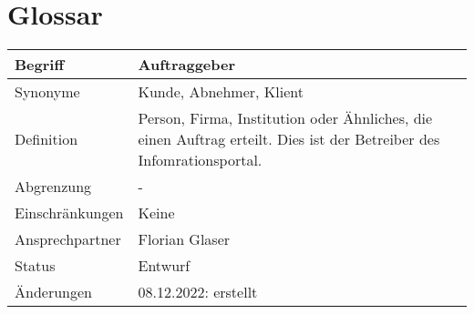 \section*{Glossar}\label{cha:glossar}


\begin{table}[H]
    \centering
    \label{gls:auftraggeber}
    \begin{tabularx}{\textwidth}{| l | X |}
        \hline
        Begriff         & Auftraggeber                                                                                                         \\
        \hline
        Synonyme        & Kunde, Abnehmer, Klient                                                                                              \\
        \hline
        Definition      & Person, Firma, Institution oder Ähnliches, die einen Auftrag erteilt. Dies ist der Betreiber des Infomrationsportal. \\
        \hline
        Abgrenzung      & -                                                                                                                    \\
        \hline
        Einschränkungen & Keine                                                                                                                \\
        \hline
        Ansprechpartner & Florian Glaser                                                                                                       \\
        \hline
        Status          & Entwurf                                                                                                              \\
        \hline
        Änderungen      & 08.12.2022: erstellt                                                                                                 \\
        \hline
    \end{tabularx}
\end{table}


